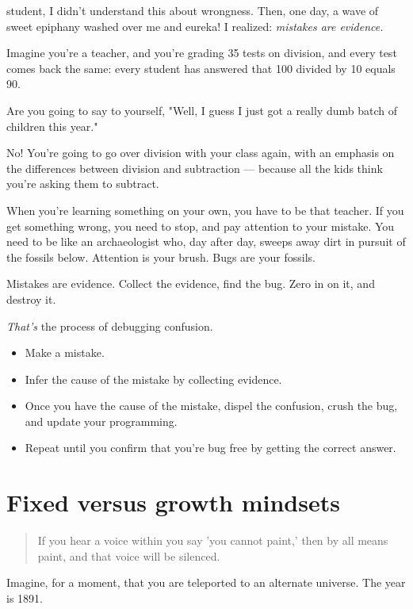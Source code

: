  student, I didn't understand this about wrongness. Then, one
day, a wave of sweet epiphany washed over me and eureka! I realized:
\textit{mistakes are evidence.}

Imagine you're a teacher, and you're grading 35 tests on division, and every test comes back the same: every student has answered that 100 divided
by 10 equals 90.

Are you going to say to yourself, "Well, I guess I just got a really dumb batch
of children this year."

No! You're going to go over division with your class again, with
an emphasis on the differences between division and subtraction --- because all
the kids think you're asking them to subtract.

When you're learning something on your own, you have to be that teacher. If you
get something wrong, you need to stop, and pay attention to your mistake. You
need to be like an archaeologist who, day after day, sweeps away dirt in pursuit of
the fossils below. Attention is your brush. Bugs are your fossils.

Mistakes are evidence. Collect the evidence, find the bug. Zero in on it, and destroy it.

\textit{That's} the process of debugging confusion.

\begin{itemize}
\item Make a mistake.
\item Infer the cause of the mistake by collecting evidence.
\item Once you have the cause of the mistake, dispel the confusion, crush the bug,
  and update your programming.
\item Repeat until you confirm that you're bug free by getting the correct answer.
\end{itemize}

\section{Fixed versus growth mindsets}

\begin{quote}
  If you hear a voice within you say 'you cannot paint,' then by all means
  paint, and that voice will be silenced.
\end{quote}

Imagine, for a moment, that you are teleported to an alternate universe. The
year is 1891.

